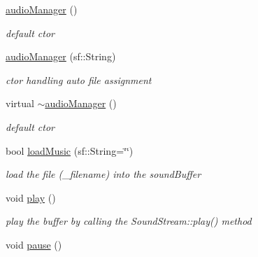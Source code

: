 \begin{DoxyCompactItemize}
\item 
\hyperlink{classaudioManager_a09546ec1cd8fb656c6d256f9bf485815}{audio\+Manager} ()\hypertarget{classaudioManager_a09546ec1cd8fb656c6d256f9bf485815}{}\label{classaudioManager_a09546ec1cd8fb656c6d256f9bf485815}

\begin{DoxyCompactList}\small\item\em default ctor \end{DoxyCompactList}\item 
\hyperlink{classaudioManager_a6beca9bae38533550aa2fd756f5ccb65}{audio\+Manager} (sf\+::\+String)\hypertarget{classaudioManager_a6beca9bae38533550aa2fd756f5ccb65}{}\label{classaudioManager_a6beca9bae38533550aa2fd756f5ccb65}

\begin{DoxyCompactList}\small\item\em ctor handling auto file assignment \end{DoxyCompactList}\item 
virtual \hyperlink{classaudioManager_ab6a24a54c7e897c0d872f6a219a48728}{$\sim$audio\+Manager} ()\hypertarget{classaudioManager_ab6a24a54c7e897c0d872f6a219a48728}{}\label{classaudioManager_ab6a24a54c7e897c0d872f6a219a48728}

\begin{DoxyCompactList}\small\item\em default ctor \end{DoxyCompactList}\item 
bool \hyperlink{classaudioManager_ada6c910430c0c1e7467ad8c6641010f7}{load\+Music} (sf\+::\+String=\char`\"{}\char`\"{})\hypertarget{classaudioManager_ada6c910430c0c1e7467ad8c6641010f7}{}\label{classaudioManager_ada6c910430c0c1e7467ad8c6641010f7}

\begin{DoxyCompactList}\small\item\em load the file (\+\_\+filename) into the sound\+Buffer \end{DoxyCompactList}\item 
void \hyperlink{classaudioManager_aa81e9bae4581eb3a4e745635f7245927}{play} ()\hypertarget{classaudioManager_aa81e9bae4581eb3a4e745635f7245927}{}\label{classaudioManager_aa81e9bae4581eb3a4e745635f7245927}

\begin{DoxyCompactList}\small\item\em play the buffer by calling the Sound\+Stream\+::play() method \end{DoxyCompactList}\item 
void \hyperlink{classaudioManager_a915f6accefbcd9ee687b9aa913b5be5f}{pause} ()\hypertarget{classaudioManager_a915f6accefbcd9ee687b9aa913b5be5f}{}\label{classaudioManager_a915f6accefbcd9ee687b9aa913b5be5f}


\end{DoxyCompactItemize}
